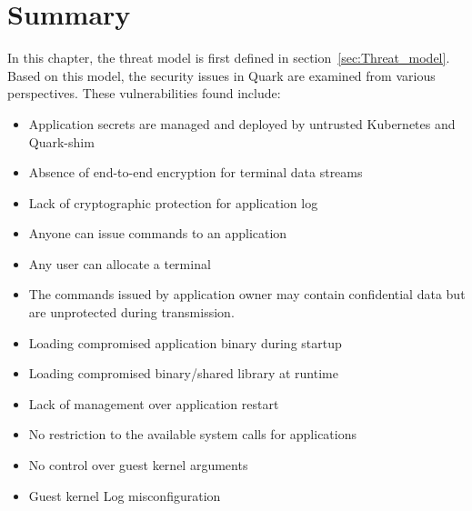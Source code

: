 \section{Summary}
In this chapter, the threat model is first defined in section~\ref{sec:Threat_model}. Based on this model, the security issues in Quark are examined from various perspectives. These vulnerabilities found include:
\begin{itemize}
  \item Application secrets are managed and deployed by untrusted Kubernetes and Quark-shim
  \item Absence of end-to-end encryption for terminal data streams
  \item  Lack of cryptographic protection for application log
  \item Anyone can issue commands to an application
  \item Any user can allocate a terminal
  \item The commands issued by application owner may contain confidential data but are unprotected during transmission.
  \item Loading compromised application binary during startup
  \item Loading compromised binary/shared library at runtime
  \item Lack of management over application restart
  \item No restriction to the available system calls for applications
  \item No control over guest kernel arguments
  \item Guest kernel Log misconfiguration

\end{itemize}

\cleardoublepage

